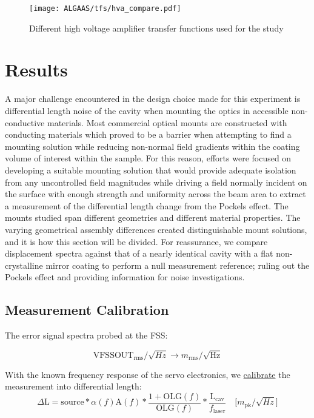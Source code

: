 \begin{figure}[H]
    \texttt{[image: ALGAAS/tfs/hva\_compare.pdf]}
    \caption{Different high voltage amplifier transfer functions used for the study}
    \label{fig:hva_compare}
\end{figure}

\section{Results}
A major challenge encountered in the design choice made for this experiment is differential length noise of the cavity when mounting the optics in accessible non-conductive materials. Most commercial optical mounts are constructed with conducting materials which proved to be a barrier when attempting to find a mounting solution while reducing non-normal field gradients within the coating volume of interest within the sample. For this reason, efforts were focused on developing a suitable mounting solution that would provide adequate isolation from any uncontrolled field magnitudes while driving a field normally incident on the surface with enough strength and uniformity across the beam area to extract a measurement of the differential length change from the Pockels effect. The mounts studied span different geometries and different material properties. The varying geometrical assembly differences created distinguishable mount solutions, and it is how this section will be divided. For reassurance, we compare displacement spectra against that of a nearly identical cavity with a flat non-crystalline mirror coating to perform a null measurement reference; ruling out the Pockels effect and providing information for noise investigations.

\subsection{Measurement Calibration}
The error signal spectra probed at the FSS:

\begin{equation}
\mathrm{VFSSOUT}_\mathrm{rms}/\sqrt{Hz} \rightarrow m_\mathrm{rms}/\sqrt{\mathrm{Hz}}
\end{equation}

With the known frequency response of the servo electronics, we \hyperref[sec:calibration]{calibrate} the measurement into differential length:
\begin{equation}
	\Delta \mathrm{L} = \mathrm{source}*\alpha(f) \mathrm{A}(f)*\frac{1+\mathrm{OLG}(f)}{\mathrm{OLG}(f)}*\frac{\mathrm{L_{cav}}}{f_\mathrm{laser}} \quad \big[ m_\mathrm{pk} / \sqrt{Hz} \big]
\end{equation}

